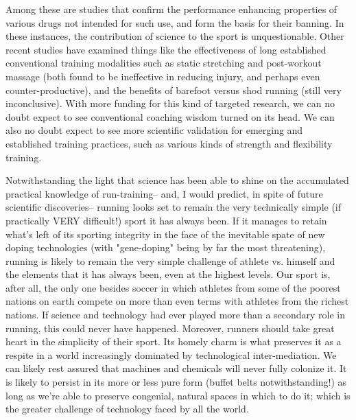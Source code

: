 Among these are studies that confirm the performance enhancing properties of various drugs not intended for such use, and form the basis for their banning. In these instances, the contribution of science to the sport is unquestionable. Other recent studies have examined things like the effectiveness of long established conventional training modalities such as static stretching and post-workout massage (both found to be ineffective in reducing injury, and perhaps even counter-productive), and the benefits of barefoot versus shod running (still very inconclusive). With more funding for this kind of targeted research, we can no doubt expect to see conventional coaching wisdom turned on its head. We can also no doubt expect to see more scientific validation for emerging and established training practices, such as various kinds of strength and flexibility training.

Notwithstanding the light that science has been able to shine on the accumulated practical knowledge of run-training-- and, I would predict, in spite of future scientific discoveries-- running looks set to remain the very technically simple (if practically VERY difficult!) sport it has always been. If it manages to retain what's left of its sporting integrity in the face of the inevitable spate of new doping technologies (with "gene-doping" being by far the most threatening), running is likely to remain the very simple challenge of athlete vs. himself and the elements that it has always been, even at the highest levels. Our sport is, after all, the only one besides soccer in which athletes from some of the poorest nations on earth compete on more than even terms with athletes from the richest nations. If science and technology had ever played more than a secondary role in running, this could never have happened. Moreover, runners should take great heart in the simplicity of their sport. Its homely charm is what preserves it as a respite in a world increasingly dominated by technological inter-mediation. We can likely rest assured that machines and chemicals will never fully colonize it. It is likely to persist in its more or less pure form (buffet belts notwithstanding!) as long as we're able to preserve congenial, natural spaces in which to do it; which is the greater challenge of technology faced by all the world.
